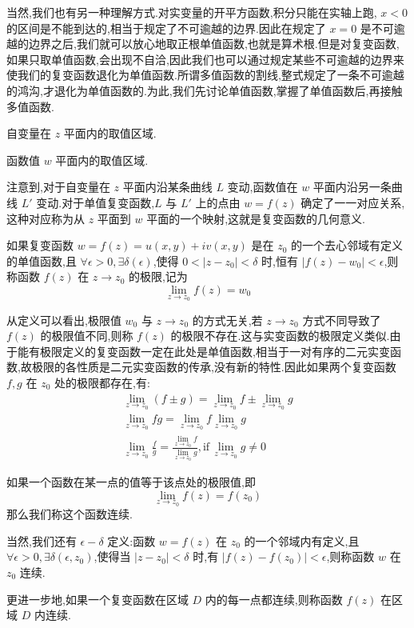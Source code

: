 \documentclass[UTF8]{ctexbook}
\begin{document}
当然,我们也有另一种理解方式.对实变量的开平方函数,积分只能在实轴上跑, $x<0$ 的区间是不能到达的,相当于规定了不可逾越的边界.因此在规定了 $x=0$ 是不可逾越的边界之后,我们就可以放心地取正根单值函数,也就是算术根.但是对复变函数,如果只取单值函数,会出现不自洽,因此我们也可以通过规定某些不可逾越的边界来使我们的复变函数退化为单值函数.所谓多值函数的割线,整式规定了一条不可逾越的鸿沟,才退化为单值函数的.为此,我们先讨论单值函数,掌握了单值函数后,再接触多值函数.

\begin{definition}[定义域]
    自变量在 $z$ 平面内的取值区域.
\end{definition}

\begin{definition}[值域]
    函数值 $w$ 平面内的取值区域.
\end{definition}

注意到,对于自变量在 $z$ 平面内沿某条曲线 $L$ 变动,函数值在 $w$ 平面内沿另一条曲线 $L'$ 变动.对于单值复变函数,$L$ 与 $L'$ 上的点由 $w=f(z)$ 确定了一一对应关系,这种对应称为从 $z$ 平面到 $w$ 平面的一个映射,这就是复变函数的几何意义.

\begin{definition}[复变函数的极限]
    如果复变函数 $w=f(z)=u(x,y)+iv(x,y)$ 是在 $z_0$ 的一个去心邻域有定义的单值函数,且 $\forall\epsilon>0,\exists\delta(\epsilon)$,使得 $0<|z-z_0|<\delta$ 时,恒有 $|f(z)-w_0|<\epsilon$,则称函数 $f(z)$ 在 $z\to z_0$ 的极限,记为
    \[
    \lim_{z\to z_0}f(z)=w_0
    \]
\end{definition}

从定义可以看出,极限值 $w_0$ 与 $z\to z_0$ 的方式无关,若 $z\to z_0$ 方式不同导致了 $f(z)$ 的极限值不同,则称 $f(z)$ 的极限不存在.这与实变函数的极限定义类似.由于能有极限定义的复变函数一定在此处是单值函数,相当于一对有序的二元实变函数,故极限的各性质是二元实变函数的传承,没有新的特性.因此如果两个复变函数 $f,g$ 在 $z_0$ 处的极限都存在,有:
\begin{align}
    \lim_{z\to z_0}(f\pm g)=\lim_{z\to z_0}f\pm \lim_{z\to z_0}g
    \label{equ:property of lim, plus minus} \\
    \lim_{z\to z_0} fg=\lim_{z\to z_0}f \lim_{z\to z_0}g
    \label{equ:property of lim, product} \\
    \lim_{z\to z_0} \frac{f}{g} = \frac{\displaystyle\lim_{z\to z_0}f}{\displaystyle\lim_{z\to z_0}g},\text{if}\,\lim_{z\to z_0}g\neq 0
    \label{equ:property of lim, division}
\end{align}

\begin{definition}[函数连续]
    如果一个函数在某一点的值等于该点处的极限值,即
    \[
    \lim_{z\to z_0} f(z)=f(z_0)
    \]
    那么我们称这个函数连续.

    当然,我们还有 $\epsilon-\delta$ 定义:函数 $w=f(z)$ 在 $z_0$ 的一个邻域内有定义,且 $\forall\epsilon>0,\exists\delta(\epsilon,z_0)$,使得当 $|z-z_0|<\delta$ 时,有 $|f(z)-f(z_0)|<\epsilon$,则称函数 $w$ 在 $z_0$ 连续.

    更进一步地,如果一个复变函数在区域 $D$ 内的每一点都连续,则称函数 $f(z)$ 在区域 $D$ 内连续.
\end{definition}
\end{document}
